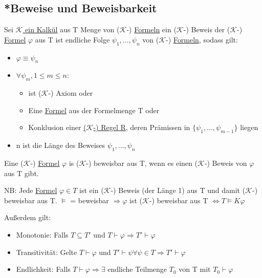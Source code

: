 \documentclass[12pt,a4paper]{article} %
\begin{document}
	\subsection{*Beweise und Beweisbarkeit}
	\label{Beweisbar}
	Sei \hyperref[Kalkul]{$\mathcal{K}$ ein Kalkül} aus T Menge von ($\mathcal{K}$-) \hyperref[Formel]{Formeln} ein ($\mathcal{K}$-) Beweis der ($\mathcal{K}$-) \hyperref[Formel]{Formel} $\varphi$ aus T ist endliche Folge $\psi_1, ..., \psi_n$ von ($\mathcal{K}$-) \hyperref[Formel]{Formeln}, sodass gilt:
	\begin{itemize}
		\item $\varphi \equiv \psi_n$
		\item $\forall \psi_m, 1 \le m \le n:$ \begin{itemize}
		\item ist ($\mathcal{K}$-) Axiom oder
		\item Eine \hyperref[Formel]{Formel} aus der Formelmenge T oder
		\item Konklusion einer \hyperref[Kalkul]{($\mathcal{K}$-) Regel R}, deren Prämissen in $\{\psi_1, ..., \psi_{m - 1}\}$ liegen
		\end{itemize}
		\item n ist die Länge des Beweises $\psi_1, ..., \psi_n$
	\end{itemize}
	
	Eine ($\mathcal{K}$-) \hyperref[Formel]{Formel} $\varphi$ is ($\mathcal{K}$-) beweisbar aus T, wenn es einen ($\mathcal{K}$-) Beweis von $\varphi$ aus T gibt.
	
	NB: Jede \hyperref[Formel]{Formel} $\varphi \in T$ ist ein ($\mathcal{K}$-) Beweis (der Länge 1) aus T und damit
	($\mathcal{K}$-) beweisbar aus T.
	$\hyperref[Erfullbar]{\vDash}$ = beweisbar $\Rightarrow \varphi$ ist ($\mathcal{K}$-) beweisbar aus T $\Leftrightarrow T \hyperref[Erfullbar]{\vDash} K \varphi$
	
	Außerdem gilt:
	
	\begin{itemize}
		\item Monotonie: Falls $T \subseteq T'$ und $T \hyperref[Beweisbar]{\vdash} \varphi \Rightarrow T' \hyperref[Beweisbar]{\vdash} \varphi$
		\item Transitivität: Gelte $T \hyperref[Beweisbar]{\vdash} \varphi$ und $T' \hyperref[Beweisbar]{\vdash} \psi \forall \psi \in T \Rightarrow T' \hyperref[Beweisbar]{\vdash} \varphi$ 
		\item Endlichkeit: Falls $T \hyperref[Beweisbar]{\vdash} \varphi \Rightarrow \exists$ endliche Teilmenge $T_0$ von T mit $T_0 \hyperref[Beweisbar]{\vdash} \varphi$
	\end{itemize}
\end{document}
